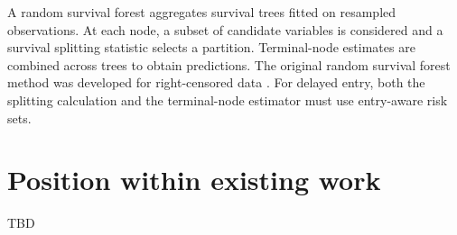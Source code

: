 A random survival forest aggregates survival trees fitted on resampled
observations. At each node, a subset of candidate variables is considered and
a survival splitting statistic selects a partition. Terminal-node estimates
are combined across trees to obtain predictions. The original random survival
forest method was developed for right-censored data \citep{ishwaran2008}.
For delayed entry, both the splitting calculation and the terminal-node
estimator must use entry-aware risk sets.

\section{Position within existing work}
TBD
